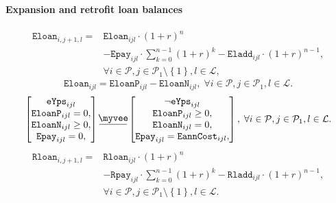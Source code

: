 \documentclass{amsart}
\newcommand{\myveebar}{\mathbin{\vcenter{\hbox{$ \underline{\mkern-2.4mu{\myvee}\mkern-2.4mu} $}}}}
\begin{document}
\paragraph{Expansion and retrofit loan balances}
%
\begin{equation}\begin{split}
    \mathtt{Eloan}_{i,j+1,l} =& \mathtt{Eloan}_{ijl} \cdot \left(1+r\right)^n \\
    &- \mathtt{Epay}_{ijl} \cdot \sum^{n-1}_{k=0} \left(1+r\right)^k 
    - \mathtt{Eladd}_{ijl} \cdot \left(1+r\right)^{n-1}, \\
    &\forall i \in \mathcal{P} ,
    j \in \mathcal{P}_1 \setminus \left\{1\right\},
    l \in \mathcal{L},
\end{split}\end{equation}
%
\begin{equation}
    \mathtt{Eloan}_{ijl} = \mathtt{EloanP}_{ijl} - \mathtt{EloanN}_{ijl}
    , \; \forall i\in \mathcal{P}, j\in \mathcal{P}_1, l\in \mathcal{L}.
\end{equation}
%
\begin{equation}
    \begin{bmatrix}
        \mathtt{eYps}_{ijl} \\
        \mathtt{EloanP}_{ijl} = 0, \\
        \mathtt{EloanN}_{ijl} \geq 0,\\
        \mathtt{Epay}_{ijl} = 0, \\
    \end{bmatrix}
    \myveebar
    \begin{bmatrix}
        \neg \mathtt{eYps}_{ijl} \\
        \mathtt{EloanP}_{ijl} \geq 0, \\
        \mathtt{EloanN}_{ijl} = 0, \\
        \mathtt{Epay}_{ijl} = \mathtt{EannCost}_{ijl}, \\
    \end{bmatrix}
    , \; \forall i\in \mathcal{P}, j\in \mathcal{P}_1, l\in \mathcal{L}.
\end{equation}
%
\begin{equation}\begin{split}
    \mathtt{Rloan}_{i,j+1,l} =& \mathtt{Rloan}_{ijl} \cdot \left(1+r\right)^n \\
    &- \mathtt{Rpay}_{ijl} \cdot \sum^{n-1}_{k=0} \left(1+r\right)^k 
    - \mathtt{Rladd}_{ijl} \cdot \left(1+r\right)^{n-1}, \\
    &\forall i \in \mathcal{P} ,
    j \in \mathcal{P}_1 \setminus \left\{1\right\},
    l \in \mathcal{L}.
\end{split}\end{equation}
\end{document}
